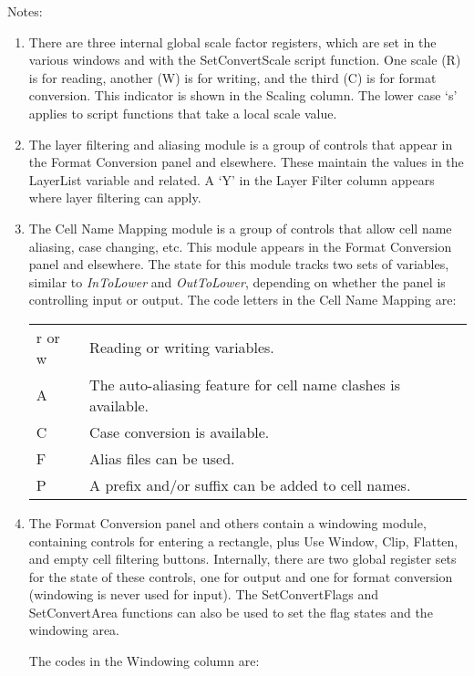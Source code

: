 Notes:
\begin{enumerate}
\item{There are three internal global scale factor registers, which
are set in the various windows and with the {\vt SetConvertScale}
script function.  One scale (R) is for reading, another (W) is for
writing, and the third (C) is for format conversion.  This indicator
is shown in the {\kb Scaling} column.  The lower case `s' applies to
script functions that take a local scale value.}

\item{The layer filtering and aliasing module is a group of controls
that appear in the {\cb Format Conversion} panel and elsewhere.  These
maintain the values in the {\et LayerList} variable and related.  A
`Y' in the {\kb Layer Filter} column appears where layer filtering can
apply.}

\item{The {\cb Cell Name Mapping} module is a group of controls that
allow cell name aliasing, case changing, etc.  This module appears in
the {\cb Format Conversion} panel and elsewhere.  The state for this
module tracks two sets of variables, similar to {\it InToLower} and
{\it OutToLower}, depending on whether the panel is controlling input
or output.  The code letters in the {\cb Cell Name Mapping} are:

\begin{tabular}{ll}
r or w & Reading or writing variables.\\
A      & The auto-aliasing feature for cell name clashes is available.\\
C      & Case conversion is available.\\
F      & Alias files can be used.\\
P      & A prefix and/or suffix can be added to cell names.\\
\end{tabular} }

\item{The {\cb Format Conversion} panel and others contain a windowing
module, containing controls for entering a rectangle, plus {\cb Use
Window}, {\cb Clip}, {\cb Flatten}, and empty cell filtering buttons. 
Internally, there are two global register sets for the state of these
controls, one for output and one for format conversion (windowing is
never used for input).  The {\vt SetConvertFlags} and {\vt
SetConvertArea} functions can also be used to set the flag states and
the windowing area.

The codes in the {\kb Windowing} column are:

}
\end{enumerate}
